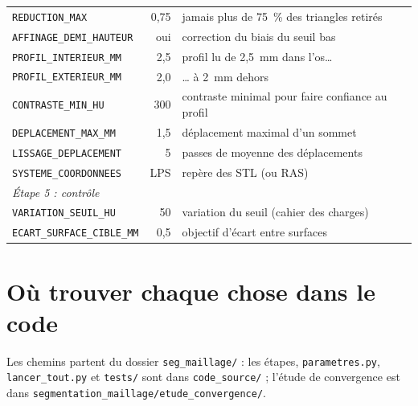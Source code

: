 \documentclass[11pt,a4paper]{article}
\newcommand{\fichier}[1]{\texttt{\small #1}}
\begin{document}
\begin{longtable}{p{5.6cm}rp{7.4cm}}
\texttt{REDUCTION\_MAX} & 0,75 & jamais plus de 75~\% des triangles retirés \\
\texttt{AFFINAGE\_DEMI\_HAUTEUR} & oui & correction du biais du seuil bas \\
\texttt{PROFIL\_INTERIEUR\_MM} & 2,5 & profil lu de 2,5~mm dans l'os\ldots \\
\texttt{PROFIL\_EXTERIEUR\_MM} & 2,0 & \ldots{} à 2~mm dehors \\
\texttt{CONTRASTE\_MIN\_HU} & 300 & contraste minimal pour faire confiance au profil \\
\texttt{DEPLACEMENT\_MAX\_MM} & 1,5 & déplacement maximal d'un sommet \\
\texttt{LISSAGE\_DEPLACEMENT} & 5 & passes de moyenne des déplacements \\
\texttt{SYSTEME\_COORDONNEES} & LPS & repère des STL (ou RAS) \\
\multicolumn{3}{l}{\textit{Étape 5 : contrôle}} \\
\texttt{VARIATION\_SEUIL\_HU} & 50 & variation du seuil (cahier des charges) \\
\texttt{ECART\_SURFACE\_CIBLE\_MM} & 0,5 & objectif d'écart entre surfaces \\
\bottomrule
\end{longtable}

\section{Où trouver chaque chose dans le code}
\label{ann-code}

Les chemins partent du dossier \fichier{seg\_maillage/} : les étapes, \fichier{parametres.py},
\fichier{lancer\_tout.py} et \fichier{tests/} sont dans \fichier{code\_source/} ; l'étude de convergence est dans
\fichier{segmentation\_maillage/etude\_convergence/}.
\end{document}
